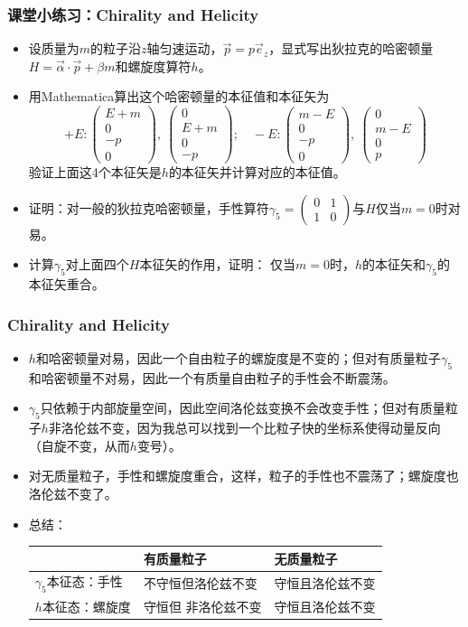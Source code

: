 \documentclass[aspectratio=1610,14pt,matheuler]{beamer}
\newcommand{\bch}{}
\newcommand{\ech}{}
\newcommand{\mat}[1]{\begin{pmatrix}#1\end{pmatrix}}
\newcommand{\red}[1]{{\color{red} #1}}
\def\green#1{{\color[rgb]{0.1,0.7,0.2}#1}}
\begin{document}
\begin{frame}
\frametitle{\bch 课堂小练习：Chirality and Helicity \ech}
\bch
\begin{itemize}
\item
设质量为$m$的粒子沿$z$轴匀速运动，$\vec p = p \vec e_z$，显式写出狄拉克的哈密顿量$H=\vec \alpha \cdot \vec p + \beta m$和螺旋度算符$h$。
\item
用{\color{red}Mathematica}算出这个哈密顿量的本征值和本征矢为
$$
+E:\mat{E+m \\ 0 \\-p \\ 0},\ \mat{0 \\ E+m \\0 \\-p};\quad -E: \mat{m-E\\0\\-p\\0},\ \mat{0\\m-E\\0 \\p}
$$
验证上面这4个本征矢是$h$的本征矢并计算对应的本征值。
\item 证明：对一般的狄拉克哈密顿量，手性算符$\gamma_5=\mat{0&1\\1&0}$与$H$仅当$m=0$时对易。
\item 计算$\gamma_5$对上面四个$H$本征矢的作用，证明：{\color{blue} 仅当$m=0$时，$h$的本征矢和$\gamma_5$的本征矢重合。}
\end{itemize}
\ech
\end{frame}

\begin{frame}
\frametitle{\bch Chirality and Helicity \ech}
\bch
\begin{itemize}
\item
$h$和哈密顿量对易，因此一个自由粒子的螺旋度是不变的；但对有质量粒子$\gamma_5$和哈密顿量不对易，因此{\color{blue}一个有质量自由粒子的手性会不断震荡。}
\item
$\gamma_5$只依赖于内部旋量空间，因此空间洛伦兹变换不会改变手性；但对{\color{blue}有质量粒子$h$非洛伦兹不变}，因为我总可以找到一个比粒子快的坐标系使得动量反向（自旋不变，从而$h$变号）。
\item {\color{blue}对无质量粒子，手性和螺旋度重合}，这样，粒子的手性也不震荡了；螺旋度也洛伦兹不变了。
\item 总结：
\begin{tabular}{l|l|l}

 & 有质量粒子 & 无质量粒子 \\ \hline
$\gamma_5$本征态：手性 & \red{不守恒}但\green{洛伦兹不变} & \green{守恒且洛伦兹不变} \\ \hline
$h$本征态：螺旋度 & \green{守恒}但\red{非洛伦兹不变} & \green{守恒且洛伦兹不变}\\
\end{tabular}
\end{itemize}
\ech
\end{frame}
\end{document}
